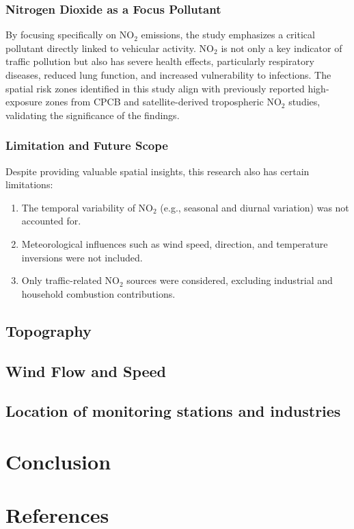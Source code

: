 \documentclass[12pt]{report}
\begin{document}
\subsection{Nitrogen Dioxide as a Focus Pollutant}
By focusing specifically on NO$_2$ emissions, the study emphasizes a critical pollutant directly linked to vehicular activity. NO$_2$ is not only a key indicator of traffic pollution but also has severe health effects, particularly respiratory diseases, reduced lung function, and increased vulnerability to infections. The spatial risk zones identified in this study align with previously reported high-exposure zones from CPCB and satellite-derived tropospheric NO$_2$ studies, validating the significance of the findings.

\subsection{Limitation and Future Scope}
Despite providing valuable spatial insights, this research also has certain limitations:
\begin{enumerate}
    \item The temporal variability of NO$_2$ (e.g., seasonal and diurnal variation) was not accounted for.
    \item Meteorological influences such as wind speed, direction, and temperature inversions were not included.
    \item Only traffic-related NO$_2$ sources were considered, excluding industrial and household combustion contributions.
\end{enumerate}


\section{Topography}
\section{Wind Flow and Speed}
\section{Location of monitoring stations and industries}

\chapter{Conclusion}

\chapter{References}
\end{document}
